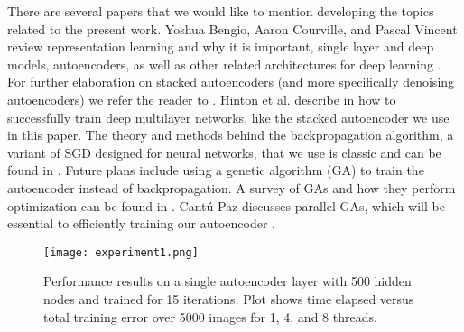 There are several papers that we would like to mention developing the topics related to the present work. Yoshua Bengio, Aaron Courville, and Pascal Vincent review representation learning and why it is important, single layer and deep models, autoencoders, as well as other related architectures for deep learning \cite{bengio2012rep}. For further elaboration on stacked autoencoders (and more specifically denoising autoencoders) we refer the reader to \cite{vincent2010stacked}. Hinton et al. describe in \cite{hinton2006learning} how to successfully train deep multilayer networks, like the stacked autoencoder we use in this paper. The theory and methods behind the backpropagation algorithm, a variant of SGD designed for neural networks, that we use is classic and can be found in \cite{hecht1989theory,bottou-91c}. Future plans include using a genetic algorithm (GA) to train the autoencoder instead of backpropagation. A survey of GAs and how they perform optimization can be found in \cite{srinivas1994genetic}. Cant{\'u}-Paz discusses parallel GAs, which will be essential to efficiently training our autoencoder \cite{cantu1998survey}.

\begin{figure}[h]
\centering
\texttt{[image: experiment1.png]}
\caption{Performance results on a single autoencoder layer with 500 hidden nodes and trained for 15 iterations. Plot shows time elapsed versus total training error over 5000 images for 1, 4, and 8 threads.}
\label{fig:experiment1}
\end{figure}

